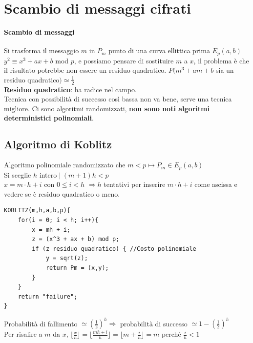 \documentclass[10pt]{book}
\begin{document}
\section{Scambio di messaggi cifrati}
\paragraph{Scambio di messaggi} Si trasforma il messaggio $m$ in $P_m$ punto di una curva ellittica prima $E_p(a,b)$\\
$y^2 \equiv x^3 + ax + b$ mod $p$, e possiamo pensare di sostituire $m$ a $x$, il problema è che il risultato potrebbe non essere un residuo quadratico. $P(m^3+am+b$ sia un residuo quadratico$) \simeq \frac{1}{2}$\\
\textbf{Residuo quadratico}: ha radice nel campo.\\
Tecnica con possibilità di successo così bassa non va bene, serve una tecnica migliore. Ci sono algoritmi randomizzati, \textbf{non sono noti algoritmi deterministici polinomiali}.
\subsection{Algoritmo di Koblitz}
Algoritmo polinomiale randomizzato che $m<p \mapsto P_m\in E_p(a,b)$\\
Si sceglie $h$ intero $|\:(m+1)h < p$\\
$x = m\cdot h + i$ con $0\leq i < h$ $\Rightarrow h$ tentativi per inserire $m\cdot h + i$ come ascissa e vedere se è residuo quadratico o meno.
\begin{lstlisting}
KOBLITZ(m,h,a,b,p){
	for(i = 0; i < h; i++){
		x = mh + i;
		z = (x^3 + ax + b) mod p;
		if (z residuo quadratico) { //Costo polinomiale
			y = sqrt(z);
			return Pm = (x,y);
		}
	}
	return "failure";
}
\end{lstlisting}
Probabilità di fallimento $\simeq\left(\frac{1}{2}\right)^h \Rightarrow$ probabilità di successo $\simeq 1 - \left(\frac{1}{2}\right)^h$\\
Per risalire a $m$ da $x$, $\lfloor\frac{x}{h}\rfloor = \lfloor \frac{mh + i}{h}\rfloor = \lfloor m + \frac{i}{h}\rfloor = m$ perché $\frac{i}{h} < 1$
\end{document}
